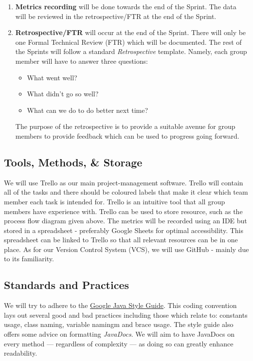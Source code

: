 \documentclass[12pt]{article}
\begin{document}
\begin{enumerate}
    \item \textbf{Metrics recording} will be done towards the end of the Sprint. The data will be reviewed in the retrospective/FTR at the end of the Sprint. 
    \item \textbf{Retrospective/FTR} will occur at the end of the Sprint. There will only be one Formal Technical Review (FTR) which will be documented. The rest of the Sprints will follow a standard \emph{Retrospective} template. Namely, each group member will have to answer three questions: 
    \begin{itemize}
    \item What went well? 
    \item What didn't go so well? 
    \item What can we do to do better next time? 
    \end{itemize}
    The purpose of the retrospective is to provide a suitable avenue for group members to provide feedback which can be used to progress going forward.
\end{enumerate}

\newpage
 
\subsection{Tools, Methods, \& Storage}
 We will use Trello as our main project-management software. Trello will contain all of the tasks and there should be coloured labels that make it clear which team member each task is intended for. Trello is an intuitive tool that all group members have experience with. Trello can be used to store resource, such as the process flow diagram given above. The metrics will be recorded using an IDE but stored in a spreadsheet - preferably Google Sheets for optimal accessibility. This spreadsheet can be linked to Trello so that all relevant resources can be in one place. As for our Version Control System (VCS), we will use GitHub - mainly due to its familiarity.
 
\subsection{Standards and Practices}
\label{practices}
We will try to adhere to the \underline{\href{https://google.github.io/styleguide/javaguide.html}{Google Java Style Guide}}. This coding convention lays out several good and bad practices including those which relate to: constants usage, class naming, variable namingm and brace usage. The style guide also offers some advice on formatting \emph{JavaDocs}. We will aim to have JavaDocs on every method --- regardless of complexity --- as doing so can greatly enhance readability.
\end{document}
